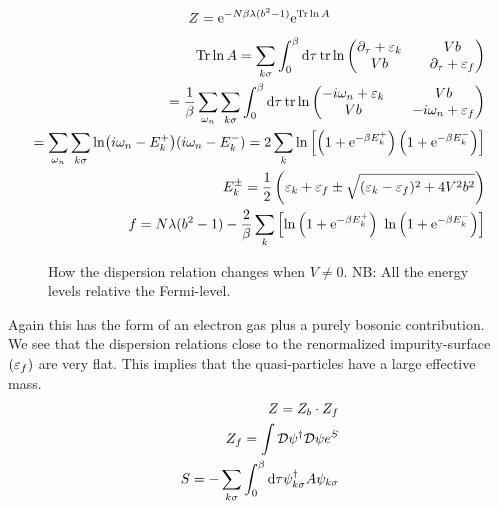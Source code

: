 \begin{align*}
    Z = \mathrm{e}^{-N\beta \lambda (b^2 - 1)} \mathrm{e}^{\Tr\ln A} 
\end{align*} 
\begin{align*}
    \Tr \ln A = \sum_{k\sigma} \int_{0}^{\beta} \dd \tau \tr \ln \begin{pmatrix} \partial_\tau + \varepsilon_k && Vb \\
    Vb && \partial_\tau + \varepsilon_f \end{pmatrix} \\ 
    = \frac{1}{\beta}\sum_{\omega_n}\sum_{k \sigma} \int_{0}^{\beta} \dd \tau \tr \ln \begin{pmatrix} -i\omega_n + \varepsilon_k && Vb \\
    Vb && -i\omega_n + \varepsilon_f \end{pmatrix} \\
    = \sum_{\omega_n}\sum_{k \sigma} \ln(i\omega_n - E_k^+)(i\omega_n - E_k^-) = 2\sum_k \ln\left[\left(1 + \mathrm{e}^{-\beta E_k^+}\right)\left(1 + \mathrm{e}^{-\beta E_k^-}\right)\right] \\
    E_k^{\pm} = \frac{1}{2}\left( \varepsilon_k + \varepsilon_f \pm \sqrt{(\varepsilon_k - \varepsilon_f)^2 +4V^2b^2} \right) \\
    f = N\lambda (b^2 - 1) - \frac{2}{\beta} \sum_k \left[ \ln \left(1 + \mathrm{e}^{-\beta E_k^+}\right)\ \ln\left(1 + \mathrm{e}^{-\beta E_k^-}\right) \right] 
\end{align*}

\begin{figure}
    \centering
    
    \caption{How the dispersion relation changes when $V \ne 0$. NB: All the energy levels relative the Fermi-level.}
    \label{fig:my_label}
\end{figure}


Again this has the form of an electron gas plus a purely bosonic contribution. \\ 

We see that the dispersion relations close to the renormalized impurity-surface $(\varepsilon_f)$ are very flat. This implies that the quasi-particles have a large effective mass. \\

\begin{align*}
    Z = Z_b \cdot Z_f \\
    Z_f = \int \mathcal{D} \psi^\dagger \mathcal{D} \psi e^S \\
    S = -\sum_{k\sigma} \int_{0}^{\beta} \dd \tau \psi^\dagger_{k\sigma} A \psi_{k\sigma} 
\end{align*}

